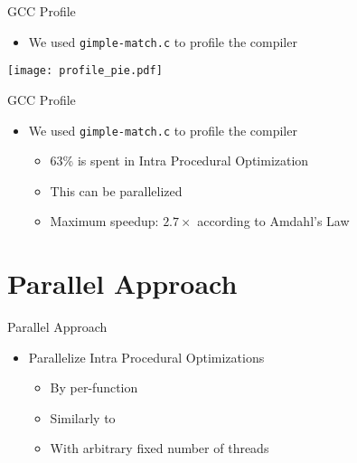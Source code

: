\begin{frame}{GCC Profile}
    \begin{itemize}
        \item We used \texttt{gimple-match.c} to profile the compiler
    \end{itemize}

            \centering
            \texttt{[image: profile\_pie.pdf]}
\end{frame}

\begin{frame}{GCC Profile}
    \begin{itemize}
        \item We used \texttt{gimple-match.c} to profile the compiler
            \begin{itemize}
                \item 63\% is spent in Intra Procedural Optimization
                \item This can be parallelized
                \item Maximum speedup: $2.7\times$ according to Amdahl's Law
            \end{itemize}
    \end{itemize}

\end{frame}

\section{Parallel Approach}

\begin{frame}{Parallel Approach}
    \begin{itemize}
        \item Parallelize Intra Procedural Optimizations
            \begin{itemize}
                \item By per-function
                \item Similarly to \cite{wortman1992}
                \item With arbitrary fixed number of threads
    \end{itemize}
\end{itemize}

\end{frame}

